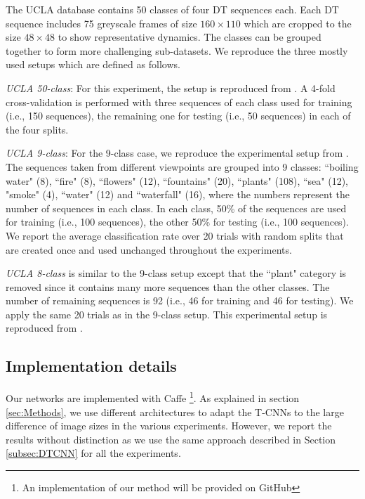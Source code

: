 \documentclass[a4paper,11pt]{article}
\begin{document}
The UCLA database \cite{doretto2003dynamic} contains 50 classes of four DT sequences each.
Each DT sequence includes 75 greyscale frames of size $160\times 110$ which are cropped to the size $48\times 48$ to show representative dynamics.
The classes can be grouped together to form more challenging sub-datasets. We reproduce the three mostly used setups which are defined as follows.

\textit{UCLA 50-class}: For this experiment, the setup is reproduced from \cite{ghanem2010maximum,xu2011dynamic,tiwari2016improved} .
A 4-fold cross-validation is performed with three sequences of each class used for training (i.e., 150 sequences), the remaining one for testing (i.e., 50 sequences) in each of the four splits.

\textit{UCLA 9-class}: For the 9-class case, we reproduce the experimental setup from \cite{ghanem2010maximum,xu2011dynamic,tiwari2016improved}.
The sequences taken from different viewpoints are grouped into 9 classes: ``boiling water" (8), ``fire" (8), ``flowers" (12), ``fountains" (20), ``plants" (108), ``sea" (12), "smoke" (4), ``water" (12) and ``waterfall" (16), where the numbers represent the number of sequences in each class.
In each class, 50\% of the sequences are used for training (i.e., 100 sequences), the other 50\% for testing (i.e., 100 sequences).
We report the average classification rate over 20 trials with random splits that are created once and used unchanged throughout the experiments.

\textit{UCLA 8-class} is similar to the 9-class setup except that the ``plant" category is removed since it contains many more sequences than the other classes.
The number of remaining sequences is 92 (i.e., 46 for training and 46 for testing).
We apply the same 20 trials as in the 9-class setup.
This experimental setup is reproduced from \cite{xu2011dynamic,tiwari2016improved}.

\subsection{Implementation details}%
\label{subsec:ImpDet}
Our networks are implemented with Caffe \cite{jia2014caffe}\footnote{An implementation of our method will be provided on GitHub}.
As explained in section \ref{sec:Methods}, we use different architectures to adapt the T-CNNs to the large difference of image sizes in the various experiments.
However, we report the results without distinction as we use the same approach described in Section \ref{subsec:DTCNN} for all the experiments.
\end{document}
